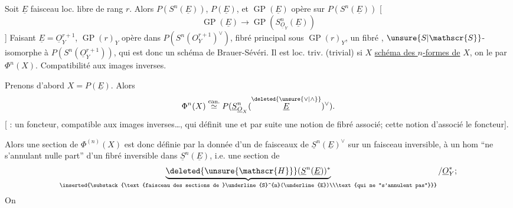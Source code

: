 Soit $\underline{E}$ faisceau loc. libre de rang $r$. Alors  $P(S^n(\underline{E}))$,   $P(\underline{E})$,  et $\operatorname{GP}(\underline{E})$ opère sur $P(S^n(\underline{E}))$   [
\[
\operatorname{GP}(\underline{E})\longrightarrow\operatorname{GP}(S^n_{\underline{O}_{Y}}(\underline{E}))
\]
] Faisant $\underline{E}=\underline{O}_{Y}^{r+1}$,  $\operatorname{GP}(r)_{Y}$ opère dans $P(S^n(O_{Y}^{r+1})^{\vee})$,   fibré principal  sous $\operatorname{GP}(r)_{Y}$,  un fibré  , $\unsure{S|\mathscr{S}}$-isomorphe à $P(S^n(\underline{O}_{Y}^{r+1}))$, qui est donc un schéma de Brauer-Sévéri. Il est loc. triv. (trivial) si $X$   \uline{schéma des $n$-formes de} $X$, on le  par $\Phi^n(X)$. Compatibilité aux images inverses.

Prenons d'abord $X=P(\underline{E})$. Alors
\[
\Phi^n(X)\overset{\text{can.}}{\simeq}P(\underline{S}^{n}_{\underline{O}_{X}}(\overset{\deleted{\unsure{\vee|\wedge}}}{\underline{E}})^{\vee}).
\]
[ :  un foncteur, compatible aux images inverses\ldots, qui définit une  et par suite une notion de fibré associé;  cette  notion d'associé  le foncteur].

 Alors une section de $\Phi^{(n)}(X)$ est donc définie par  la donnée d'un  de faisceaux de $\underline{S}^{n}(\underline{E})^{\vee}$ sur un  faisceau inversible,  à un hom ``ne s'annulant nulle part'' d'un fibré inversible dans $\underline{S}^{n}(\underline{E})$, i.e. une section de
\[
\underbrace{\deleted{\unsure{\mathscr{H}}}(\underline{S}^{n}(\underline{E}))^{*}}_{\inserted{\substack{\text{faisceau des sections de }\underline{S}^{n}(\underline{E})\\\text{qui ne ``s'annulent pas''}}}}/\underline{O}_{Y}^{*};
\]
On 
